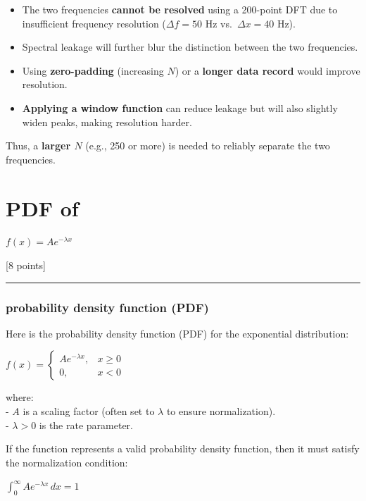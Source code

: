 \documentclass[11pt]{article}
\providecommand{\tightlist}{%
      \setlength{\itemsep}{0pt}\setlength{\parskip}{0pt}}
\begin{document}
\begin{itemize}
\tightlist
\item
  The two frequencies \textbf{cannot be resolved} using a 200-point DFT
  due to insufficient frequency resolution (\(\Delta f = 50\) Hz
  vs.~\(\Delta x = 40\) Hz).
\item
  Spectral leakage will further blur the distinction between the two
  frequencies.
\item
  Using \textbf{zero-padding} (increasing \(N\)) or a \textbf{longer
  data record} would improve resolution.
\item
  \textbf{Applying a window function} can reduce leakage but will also
  slightly widen peaks, making resolution harder.
\end{itemize}

Thus, a \textbf{larger \(N\)} (e.g., 250 or more) is needed to reliably
separate the two frequencies.

    \section{PDF of}\label{pdf-of}

\(f(x) = A e^{- \lambda x}\)

{[}8 points{]}

    \begin{center}\rule{0.5\linewidth}{0.5pt}\end{center}

\subsubsection{probability density function
(PDF)}\label{probability-density-function-pdf}

Here is the probability density function (PDF) for the exponential
distribution:

\(f(x) = \begin{cases} A e^{-\lambda x}, & x \geq 0 \\ 0, & x < 0 \end{cases}\)

where:\\
- \(A\) is a scaling factor (often set to \(\lambda\) to ensure
normalization).\\
- \(\lambda > 0\) is the rate parameter.

If the function represents a valid probability density function, then it
must satisfy the normalization condition:

\(\int_0^\infty A e^{-\lambda x} \, dx = 1\)
\end{document}
